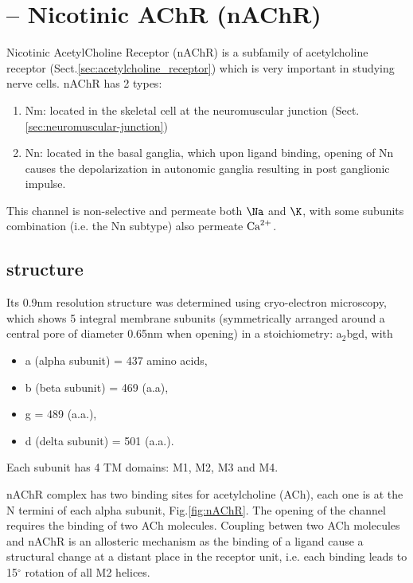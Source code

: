 \section{-- Nicotinic AChR (nAChR)}
\label{sec:nAChR}


Nicotinic AcetylCholine Receptor (nAChR) is a subfamily of acetylcholine
receptor (Sect.\ref{sec:acetylcholine_receptor}) which is very important in
studying nerve cells. nAChR has 2 types:
\begin{enumerate}
  \item Nm: located in the skeletal cell at the neuromuscular junction
  (Sect.\ref{sec:neuromuscular-junction})
  
  \item Nn: located in the basal ganglia, which upon ligand binding, opening of
  Nn causes the depolarization  in autonomic ganglia resulting in post
  ganglionic impulse.
\end{enumerate}
This channel is non-selective and permeate both $\Na$
and $\K$, with some subunits combination (i.e. the Nn subtype) also permeate
${\text{Ca}^{2+}}$.

\subsection{structure}

Its 0.9nm resolution structure was determined using cryo-electron microscopy,
which shows 5 integral membrane subunits (symmetrically arranged around a
central pore of diameter 0.65nm when opening) in a stoichiometry:
a$_2$bgd, with 
\begin{itemize}
  \item a (alpha subunit) = 437 amino acids, 
  \item b (beta subunit) = 469 (a.a), 
  \item g = 489 (a.a.), 
  \item d (delta subunit) = 501 (a.a.). 
\end{itemize}
Each subunit has 4 TM domains: M1, M2, M3 and M4.

nAChR complex has two binding sites for acetylcholine (ACh), each one is at the
N termini of each alpha subunit, Fig.\ref{fig:nAChR}.
The opening of the channel requires the binding of two ACh molecules.
Coupling betwen two ACh molecules and nAChR is an allosteric
mechanism as the binding of a ligand cause a structural change at a distant
place in the receptor unit, i.e.
each binding leads to 15$^\circ$ rotation of all M2 helices.


